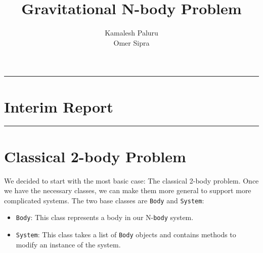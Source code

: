\documentclass[hidelinks, 11pt]{article}
\title{Gravitational N-body Problem}
\author{Kamalesh Paluru \\ Omer Sipra}
\newcommand{\psection}[1]{{
    \begin{center}
        \noindent \rule{17cm}{0.4pt}
            \section*{\LARGE #1}
        \noindent \rule{17cm}{0.4pt}
    \end{center}
}}
\newcommand{\psubsection}[1]{
    \noindent 
    \section*{#1}
}
\begin{document}
\maketitle

\newpage

\psection{Interim Report}

\psubsection{Classical 2-body Problem}

We decided to start with the most basic case: The classical 2-body problem. Once we have the necessary classes, we can make them more general to support more complicated systems. The two base classes are \texttt{Body} and \texttt{System}:

\begin{itemize}
    \item \texttt{Body}: This class represents a body in our N-\texttt{body} system.
    \item \texttt{System}: This class takes a list of \texttt{Body} objects and contains methods to modify an instance of the system.
\end{itemize}
\end{document}
